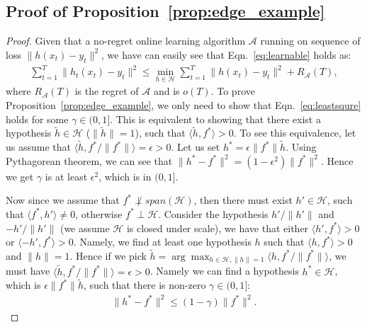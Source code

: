 \subsection{Proof of Proposition~\ref{prop:edge_example}}
\begin{proof}
Given that a no-regret online learning algorithm $\mathcal{A}$ running on sequence of loss $\|h(x_t) - y_t\|^2$, we have can easily see that Eqn.~\ref{eq:learnable} holds as:
\begin{align}
\sum_{t=1}^T\|h_t(x_t) - y_t\|^2\leq \min_{h\in\mathcal{H}}\sum_{t=1}^T\|h(x_t) - y_t\|^2 + R_{\mathcal{A}}(T), 
\end{align}where $R_{\mathcal{A}}(T)$ is the regret of $\mathcal{A}$ and is $o(T)$. To prove Proposition~\ref{prop:edge_example}, we only need to show that Eqn.~\ref{eq:leastsqure} holds for some $\gamma\in(0,1]$. This is equivalent to showing that there exist a hypothesis $\tilde{h}\in\mathcal{H}$ ($\|\tilde{h}\| = 1$), such that $\langle \tilde{h}, f^* \rangle > 0$. To see this equivalence, let us assume that $\langle \tilde{h}, f^*/\|f^*\| \rangle = \epsilon > 0$. Let us set $h^* = \epsilon\|f^*\| \tilde{h}$. Using Pythagorean theorem, we can see that $\| h^* - f^* \|^2 = (1-\epsilon^2)\|f^*\|^2$. Hence we get $\gamma$ is at least $\epsilon^2$, which is in $(0,1]$. 


Now since we assume that $f^*\not\perp span(\mathcal{H})$, then there must exist ${h}'\in \mathcal{H}$, such that $\langle f^*, h'\rangle\neq 0$, otherwise $f^*\perp\mathcal{H}$. Consider the hypothesis $h'/\|h'\|$ and $-h'/\|h'\|$ (we assume $\mathcal{H}$ is closed under scale), we have that either $\langle h', f^*\rangle >0$ or $\langle -h', f^* \rangle >0$. Namely, we find at least one hypothesis $h$ such that $\langle h, f^*\rangle >0$ and $\|h\| = 1$.  Hence if we pick $\tilde{h} = \arg\max_{h\in\mathcal{H}, \|h\|=1} \langle h, f^*/\|f^*\| \rangle$, we must have $\langle  \tilde{h}, f^*/\|f^*\|\rangle = \epsilon >0$. Namely we can find a hypothesis $h^*\in\mathcal{H}$, which is $\epsilon\|f^*\|\tilde{h}$, such that there is non-zero $\gamma\in(0,1]$:
\begin{align}
\|h^* - f^* \|^2\leq (1-\gamma)\|f^*\|^2.
\end{align}







\end{proof}

